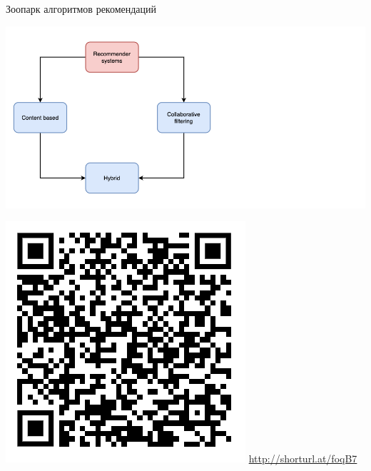 \documentclass[11pt,aspectratio=169,handout]{beamer}
\begin{document}
\begin{frame}{Зоопарк алгоритмов рекомендаций \cite{ali_2021}}

\begin{center}
\includegraphics[scale=0.27]{images/taxonomy-1.png}
\end{center}

\includegraphics[scale=0.3]{images/poll.png} \hfill \url{http://shorturl.at/foqB7}

\end{frame}
\end{document}
